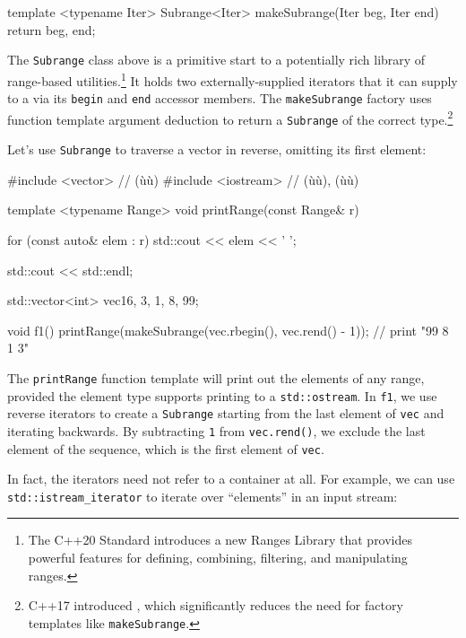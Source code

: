 {{\begin{emcppslisting}[emcppsbatch=e2]
template <typename Iter>
Subrange<Iter> makeSubrange(Iter beg, Iter end) { return {beg, end}; }
\end{emcppslisting}
    

\noindent The \lstinline!Subrange! class above is a primitive start to a potentially
rich library of range-based utilities.{\cprotect\footnote{The C++20
Standard introduces a new Ranges Library that provides powerful
  features for defining, combining, filtering, and manipulating ranges.}}
It holds two externally-supplied iterators that it can supply to a
 via its \lstinline!begin! and
\lstinline!end! accessor members. The \lstinline!makeSubrange! factory uses
function template argument deduction to return a \lstinline!Subrange! of
the correct type.{\cprotect\footnote{C++17 introduced , which significantly reduces the need for
  factory templates like \lstinline!makeSubrange!.}}

Let's use \lstinline!Subrange! to traverse a vector in reverse, omitting
its first element:

\begin{emcppslisting}[emcppsbatch=e2]
#include <vector>    // (ù{}ù)
#include <iostream>  // (ù{}ù), (ù{}ù)

template <typename Range>
void printRange(const Range& r)
{
    for (const auto& elem : r)
    {
        std::cout << elem << ' ';
    }

    std::cout << std::endl;
}

std::vector<int> vec{16, 3, 1, 8, 99};

void f1()
{
    printRange(makeSubrange(vec.rbegin(), vec.rend() - 1));
        // print "99 8 1 3"
}
\end{emcppslisting}
    

\noindent The \lstinline!printRange! function template will print out the elements of
any range, provided the element type supports printing to a
\lstinline!std::ostream!. In \lstinline!f1!, we use reverse iterators to
create a \lstinline!Subrange! starting from the last element of
\lstinline!vec! and iterating backwards. By subtracting \lstinline!1! from
\lstinline!vec.rend()!, we exclude the last element of the sequence, which
is the first element of \lstinline!vec!.

In fact, the iterators need not refer to a container at all. For
example, we can use \lstinline!std::istream_iterator! to iterate over
``elements'' in an input stream:

}}
